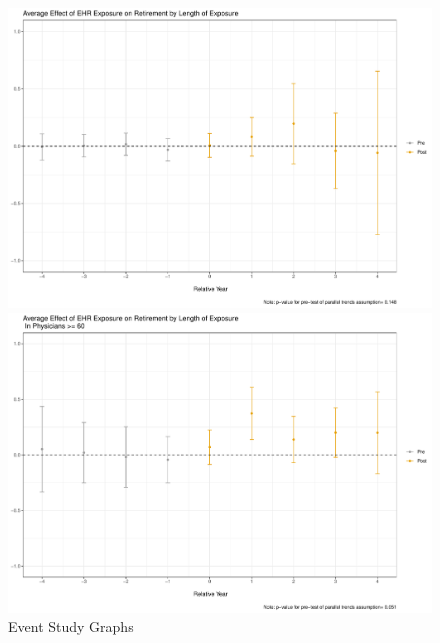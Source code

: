 \documentclass[11pt]{article}
\begin{document}
\vspace{5mm}
\begin{figure}[ht]
\caption{Event Study Graphs}
\vspace{2mm}
        \begin{minipage}[b]{0.47\linewidth}
            \centering
            \includegraphics[width=\textwidth]{Objects/ggdid_retire_allEHR.pdf}
        \end{minipage}
        \hspace{0.2cm}
        \begin{minipage}[b]{0.47\linewidth}
            \centering
            \includegraphics[width=\textwidth]{Objects/ggdid_retire_allEHR_old.pdf}
        \end{minipage}
        \label{fig:retirefirst}
\end{figure}
\vspace{5mm}
\end{document}
